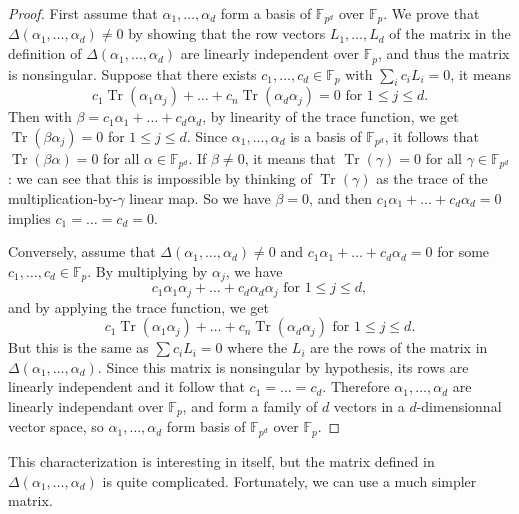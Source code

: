 \documentclass[a4paper,11pt]{article}
\theoremstyle{break}
\theoremstyle{sc}
\theoremstyle{definition}
\theoremstyle{remark}
\DeclareMathOperator{\Tr}{Tr}
\begin{document}
\begin{proof}
  First assume that $\alpha_1, \dots, \alpha_d$ form a basis of
  $\mathbb{F}_{p^d}$ over $\mathbb{F}_p$. We prove that
  $\Delta(\alpha_1, \dots, \alpha_d)\neq0$ by showing that the row vectors
  $L_1, \dots, L_d$ of
  the matrix in the definition of $\Delta(\alpha_1, \dots, \alpha_d)$ are
  linearly independent over $\mathbb{F}_p$, and thus the matrix is
  nonsingular. Suppose that there exists $c_1, \dots,
  c_d\in\mathbb{F}_p$ with $\sum_i c_iL_i = 0$, it means
  \[
    c_1\Tr(\alpha_1\alpha_j) + \dots + c_n\Tr(\alpha_d\alpha_j) =
    0\textrm{ for }1\leq j\leq d.
  \]
  Then with $\beta=c_1\alpha_1 + \dots + c_d\alpha_d$, by linearity of the
  trace function, we get $\Tr(\beta\alpha_j) = 0$ for $1\leq j\leq d$. Since
  $\alpha_1, \dots, \alpha_d$ is a basis of $\mathbb{F}_{p^d}$, it follows
  that $\Tr(\beta\alpha) = 0$ for all $\alpha\in\mathbb{F}_{p^d}$. If
  $\beta\neq0$, it means that $\Tr(\gamma)=0$ for all
  $\gamma\in\mathbb{F}_{p^d}$ : we can see that this is impossible by thinking
  of $\Tr(\gamma)$ as the trace of the multiplication-by-$\gamma$ linear map. So we have $\beta=0$, and then
  $c_1\alpha_1 + \dots + c_d\alpha_d = 0$ implies $c_1=\dots=c_d=0$.

  Conversely, assume that $\Delta(\alpha_1, \dots, \alpha_d)\neq0$ and
  $c_1\alpha_1+\dots+c_d\alpha_d=0$ for some $c_1, \dots,
  c_d\in\mathbb{F}_p$. By multiplying by $\alpha_j$, we have
  \[
    c_1\alpha_1\alpha_j+\dots+c_d\alpha_d\alpha_j\textrm{ for }1\leq j \leq d,
  \]
  and by applying the trace function, we get
  \[
    c_1\Tr(\alpha_1\alpha_j)+\dots+c_n\Tr(\alpha_d\alpha_j)\textrm{ for }1\leq
    j\leq d.
  \]
  But this is the same as $\sum c_iL_i=0$ where the $L_i$ are the rows of the
  matrix in $\Delta(\alpha_1, \dots, \alpha_d)$. Since this matrix is
  nonsingular by hypothesis, its rows are linearly independent and it follow
  that $c_1=\dots=c_d$. Therefore $\alpha_1, \dots, \alpha_d$ are linearly
  independant over $\mathbb{F}_p$, and form a family of $d$ vectors in a
  $d$-dimensionnal vector space, so $\alpha_1, \dots, \alpha_d$ form  basis of
  $\mathbb{F}_{p^d}$ over $\mathbb{F}_p$.
\end{proof}

This characterization is interesting in itself, but the matrix defined in
$\Delta(\alpha_1, \dots, \alpha_d)$ is quite complicated. Fortunately,
we can use a much simpler matrix.
\end{document}
